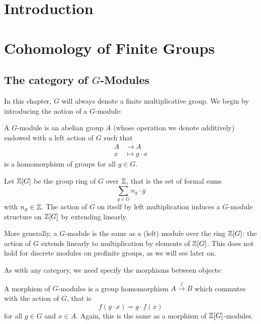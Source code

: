 \documentclass[a4paper, oneside]{memoir}
\begin{document}
\tableofcontents

\chapter*{Introduction}



\chapter{Cohomology of Finite Groups}

\section{The category of $G$-Modules}

In this chapter, $G$ will always denote a finite multiplicative group. We begin by introducing the notion of a $G$-module:

\begin{definition}
    A $G$-module is an abelian group $A$ (whose operation we denote additively) endowed with a left action of $G$ such that
    \begin{align*}
        A & \longrightarrow A    \\
        x & \longmapsto g\cdot x
    \end{align*}
    is a homomorphism of groups for all $g\in G$.
\end{definition}

\begin{remark}
    Let $\mathbb{Z}[G]$ be the group ring of $G$ over $\mathbb{Z}$, that is the set of formal sums
    \[
        \sum_{g\in G}{n_g\cdot g}
    \]
    with $n_g\in\mathbb{Z}$. The action of $G$ on itself by left multiplication induces a $G$-module structure on $\mathbb{Z}[G]$ by extending linearly.

    More generally, a $G$-module is the same as a (left) module over the ring $\mathbb{Z}[G]$: the action of $G$ extends linearly to multiplication by elements of $\mathbb{Z}[G]$. This does not hold for discrete modules on profinite groups, as we will see later on.
\end{remark}

As with any category, we need specify the morphisms between objects:

\begin{definition}
    A morphism of $G$-modules is a group homomorphism $A\overset{f}{\to} B$ which commutes with the action of $G$, that is
    \[
        f(g\cdot x)=g\cdot f(x)
    \]
    for all $g\in G$ and $x\in A$. Again, this is the same as a morphism of $\mathbb{Z}[G]$-modules.
\end{definition}
\end{document}
